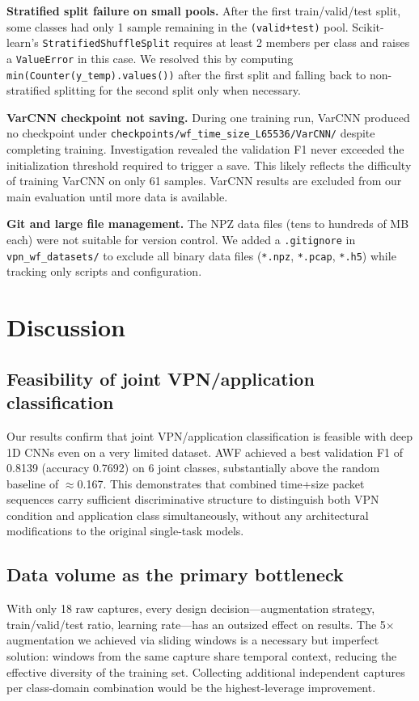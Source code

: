 \documentclass[letterpaper,twocolumn,10pt]{article}
\begin{document}
\textbf{Stratified split failure on small pools.} After the first train/valid/test split, some classes had only 1 sample remaining in the \texttt{(valid+test)} pool. Scikit-learn's \texttt{StratifiedShuffleSplit} requires at least 2 members per class and raises a \texttt{ValueError} in this case. We resolved this by computing \texttt{min(Counter(y\_temp).values())} after the first split and falling back to non-stratified splitting for the second split only when necessary.

\textbf{VarCNN checkpoint not saving.} During one training run, VarCNN produced no checkpoint under \texttt{checkpoints/wf\_time\_size\_L65536/VarCNN/} despite completing training. Investigation revealed the validation F1 never exceeded the initialization threshold required to trigger a save. This likely reflects the difficulty of training VarCNN on only 61 samples. VarCNN results are excluded from our main evaluation until more data is available.

\textbf{Git and large file management.} The NPZ data files (tens to hundreds of MB each) were not suitable for version control. We added a \texttt{.gitignore} in \texttt{vpn\_wf\_datasets/} to exclude all binary data files (\texttt{*.npz}, \texttt{*.pcap}, \texttt{*.h5}) while tracking only scripts and configuration.

\section{Discussion}

\subsection{Feasibility of joint VPN/application classification}
Our results confirm that joint VPN/application classification is feasible with deep 1D CNNs even on a very limited dataset. AWF achieved a best validation F1 of 0.8139 (accuracy 0.7692) on 6 joint classes, substantially above the random baseline of $\approx$0.167. This demonstrates that combined time+size packet sequences carry sufficient discriminative structure to distinguish both VPN condition and application class simultaneously, without any architectural modifications to the original single-task models.

\subsection{Data volume as the primary bottleneck}
With only 18 raw captures, every design decision---augmentation strategy, train/valid/test ratio, learning rate---has an outsized effect on results. The 5$\times$ augmentation we achieved via sliding windows is a necessary but imperfect solution: windows from the same capture share temporal context, reducing the effective diversity of the training set. Collecting additional independent captures per class-domain combination would be the highest-leverage improvement.
\end{document}
